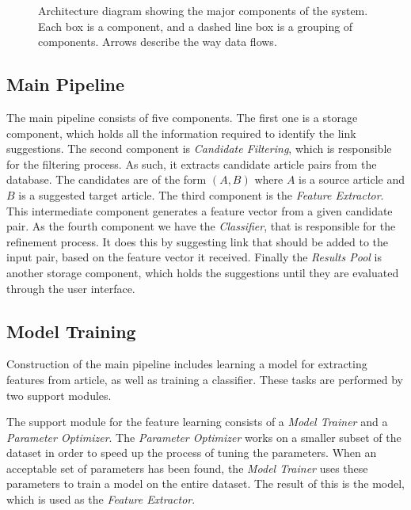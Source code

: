 \begin{figure}[tb]%
  \centering
  
\caption[Architecture diagram showing the major components of the system]{Architecture diagram showing the major components of the system. Each box is a component, and a dashed line box is a grouping of components. Arrows describe the way data flows.}%
\label{fig:system-overview}%
\end{figure}

\subsection{Main Pipeline}
The main pipeline consists of five components. The first one is a storage component, which holds all the information required to identify the link suggestions. The second component is \emph{Candidate Filtering}, which is responsible for the filtering process. As such, it extracts candidate article pairs from the database. The candidates are of the form $(A,B)$ where $A$ is a source article and $B$ is a suggested target article. The third component is the \emph{Feature Extractor}. This intermediate component generates a feature vector from a given candidate pair. As the fourth component we have the \emph{Classifier}, that is responsible for the refinement process. It does this by suggesting link that should be added to the input pair, based on the feature vector it received. Finally the \emph{Results Pool} is another storage component, which holds the suggestions until they are evaluated through the user interface.

\subsection{Model Training}
Construction of the main pipeline includes learning a model for extracting features from article, as well as training a classifier. These tasks are performed by two support modules.

The support module for the feature learning consists of a \emph{Model Trainer} and a \emph{Parameter Optimizer}. The \emph{Parameter Optimizer} works on a smaller subset of the dataset in order to speed up the process of tuning the parameters. When an acceptable set of parameters has been found, the \emph{Model Trainer} uses these parameters to train a model on the entire dataset. The result of this is the model, which is used as the \emph{Feature Extractor}.

